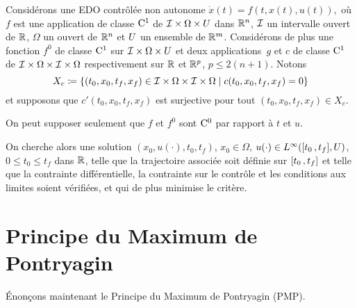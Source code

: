 \begin{myassumption}
    \label{hyp:pmp}
    Consid\'erons une EDO contr\^ol\'ee non autonome $\dot{x}(t) = f(t,x(t),u(t)),$ o\`u $f$ est une application de classe
    ${\rm C}^1$ de $\mathcal{I} \times \Omega \times U$ dans $\mathbb{R}^n$, $\mathcal{I}$ un intervalle ouvert de $\mathbb{R}$, $\Omega$ un ouvert de $\mathbb{R}^n$
    et $U$ un ensemble  de $\mathbb{R}^m$. Consid\'erons de plus une fonction $f^0$ de classe
    ${\rm C}^1$ sur $\mathcal{I} \times \Omega \times U$ et deux applications\footnotemark\ $g$ et $c$ de classe ${\rm C}^1$ de
    $\mathcal{I} \times \Omega \times \mathcal{I} \times \Omega$ respectivement sur $\mathbb{R}$ et $\mathbb{R}^p$, $p \le 2(n+1)$.
    Notons $$X_c \coloneqq \left\{(t_0,x_0,t_f,x_f) \in \mathcal{I} \times \Omega \times \mathcal{I} \times \Omega\mathrel{}\middle|\mathrel{}c(t_0,x_0,t_f,x_f) = 0\right\}$$
    et supposons que $c'(t_0,x_0,t_f,x_f)$ est surjective pour tout
    $(t_0,x_0,t_f,x_f) \in X_c$.
\end{myassumption}

\begin{myremark}
    On peut supposer seulement que $f$ et $f^0$ sont ${\rm C}^0$ par rapport \`a $t$ et $u$.
\end{myremark}


%
On cherche alors une solution $(x_0,u(\cdot),t_0,t_f)$, $x_0 \in \Omega$, $u(\cdot) \in L^\infty(\mathopen{[}t_0 \mathclose{}\mathpunct{},t_f \mathclose{]},U)$, 
$0 \le t_0 \le t_f$ dans $\mathbb{R}$, telle que la trajectoire associ\'ee  soit d\'efinie sur 
$\mathopen{[}t_0 \mathclose{}\mathpunct{},t_f \mathclose{]}$ et telle que la contrainte diff\'erentielle, la contrainte sur le contr\^ole et les conditions
aux limites soient v\'erifi\'ees, et qui de plus minimise le crit\`ere.


\section{Principe du Maximum de Pontryagin}

\'Enon\c cons maintenant le Principe du Maximum de Pontryagin (PMP).

